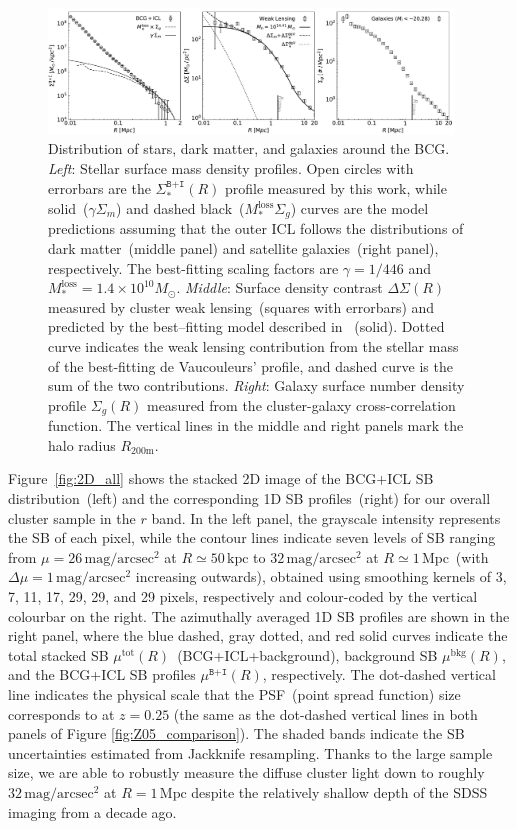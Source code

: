 \documentclass[fleqn,usenatbib]{mnras}
\def\mrm{\mathrm}
\newcommand{\sigbi}{\Sigma_*^{\texttt{B+I}}}
\newcommand{\sigm}{\Sigma_m}
\newcommand{\sigg}{\Sigma_g}
\newcommand{\mubi}{\mu^{\texttt{B+I}}}
\newcommand{\sbmag}{\mathrm{mag}/\mathrm{arcsec}^{2}}
\newcommand{\mpc}{\mathrm{Mpc}}
\newcommand{\kpc}{\mathrm{kpc}}
\newcommand{\msol}{M_{\odot}}
\newcommand{\ds}{\Delta\Sigma}
\begin{document}
\begin{figure}
    \centering\includegraphics[width=0.96\textwidth]{fig/total_sample_SB_SM.pdf}
    \caption{Distribution of stars, dark matter, and galaxies around the
    BCG.  {\it Left}: Stellar surface mass density profiles. Open circles
    with errorbars are the $\sigbi(R)$ profile measured by this work, while
    solid~($\gamma\sigm$) and dashed black~($M_*^{\mathrm{loss}}\sigg$)
    curves are the model predictions assuming that the outer ICL follows
    the distributions of dark matter~(middle panel) and satellite
    galaxies~(right panel), respectively. The best-fitting scaling factors
    are $\gamma{=}1/446$ and
    $M_*^{\mathrm{loss}}{=}1.4{\times}10^{10}\msol$.  {\it Middle}: Surface
    density contrast $\ds(R)$ measured by cluster weak lensing~(squares
    with errorbars) and predicted by the best--fitting model described in
    ~(solid). Dotted curve indicates the weak lensing
    contribution from the stellar mass of the best-fitting de Vaucouleurs'
    profile, and dashed curve is the sum of the two contributions.  {\it
    Right}: Galaxy surface number density profile $\sigg(R)$ measured from
    the cluster-galaxy cross-correlation function. The vertical lines in
    the middle and right panels mark the halo radius $R_{200\mrm{m}}$.
    \label{fig:massprof3panel} }
\end{figure}

Figure~\ref{fig:2D_all} shows the stacked 2D image of the BCG+ICL SB
distribution~(left) and the corresponding 1D SB profiles~(right) for our
overall cluster sample in the $r$ band. In the left panel, the grayscale
intensity represents the SB of each pixel, while the contour lines indicate
seven levels of SB ranging from $\mu{=}26\,\sbmag$ at $R{\simeq}50\,\kpc$
to $32\,\sbmag$ at $R{\simeq}1\,\mpc$~(with $\Delta \mu{=}1\,\sbmag$
increasing outwards),
obtained using smoothing kernels of 3, 7, 11, 17, 29, 29, and 29 pixels,
respectively and colour-coded by the vertical colourbar on the right.
The azimuthally averaged 1D SB profiles are shown in the
right panel, where the blue dashed, gray dotted, and red solid curves
indicate the total stacked SB $\mu^{\mathrm{tot}}(R)$~(BCG+ICL+background),
background SB $\mu^{\mathrm{bkg}}(R)$, and the BCG+ICL SB profiles
$\mubi(R)$, respectively. The dot-dashed vertical line indicates the
physical scale that the PSF~(point spread function) size corresponds to at
$z{=}0.25$ (the same as the dot-dashed vertical lines in both panels of
Figure \ref{fig:Z05_comparison}).  The shaded bands indicate the SB
uncertainties estimated from Jackknife resampling. Thanks to the large
sample size, we are able to robustly measure the diffuse cluster light down
to roughly $32\,\sbmag$ at $R{=}1\,\mpc$ despite the relatively shallow
depth of the SDSS imaging from a decade ago.
\end{document}
